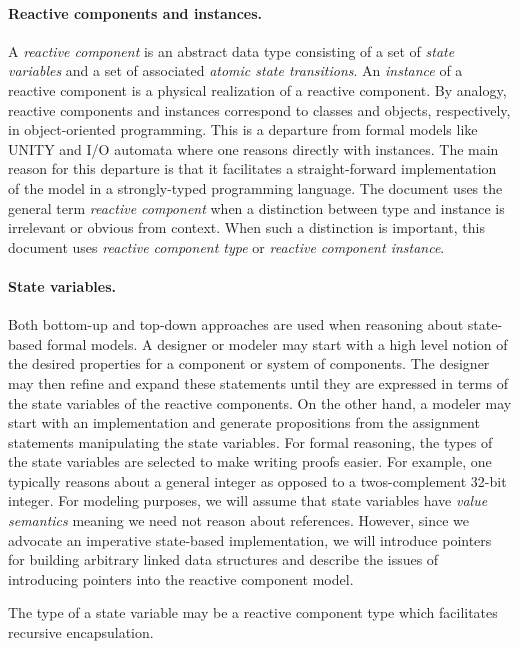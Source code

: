 \paragraph{Reactive components and instances.}
A \emph{reactive component} is an abstract data type consisting of a set of \emph{state variables} and a set of associated \emph{atomic state transitions}.
An \emph{instance} of a reactive component is a physical realization of a reactive component.
By analogy, reactive components and instances correspond to classes and objects, respectively, in object-oriented programming.
This is a departure from formal models like UNITY and I/O automata where one reasons directly with instances.
The main reason for this departure is that it facilitates a straight-forward implementation of the model in a strongly-typed programming language.
The document uses the general term \emph{reactive component} when a distinction between type and instance is irrelevant or obvious from context.
When such a distinction is important, this document uses \emph{reactive component type} or \emph{reactive component instance}.

\paragraph{State variables.}
Both bottom-up and top-down approaches are used when reasoning about state-based formal models.
A designer or modeler may start with a high level notion of the desired properties for a component or system of components.
The designer may then refine and expand these statements until they are expressed in terms of the state variables of the reactive components.
On the other hand, a modeler may start with an implementation and generate propositions from the assignment statements manipulating the state variables.
For formal reasoning, the types of the state variables are selected to make writing proofs easier.
For example, one typically reasons about a general integer as opposed to a twos-complement 32-bit integer.
For modeling purposes, we will assume that state variables have \emph{value semantics} meaning we need not reason about references.
However, since we advocate an imperative state-based implementation, we will introduce pointers for building arbitrary linked data structures and describe the issues of introducing pointers into the reactive component model.

The type of a state variable may be a reactive component type which facilitates recursive encapsulation.

